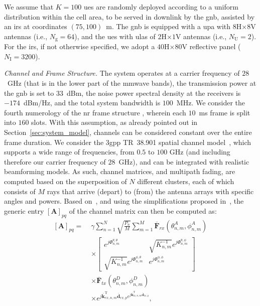 We assume that $K=100$ \glspl{ue} are randomly deployed according to a uniform distribution within the cell area, to be served in downlink by the \gls{gnb}, assisted by an \gls{irs} at coordinates  $(75, 100)$~m. 
The \gls{gnb} is equipped with a \gls{upa} with $8$H$\times8$V antennas (i.e., $N_{\mathrm g}=64$), and the \glspl{ue} with \glspl{ula} of $2$H$\times1$V antennas (i.e., $N_{\mathrm U} = 2$). 
For the \gls{irs}, if not otherwise specified, we adopt a $40$H$\times80$V reflective panel ($N_{\mathrm I}= 3200$).

\emph{Channel and Frame Structure.}
The system operates at a carrier frequency of $28$~GHz (that is in the lower part of the \gls{mmwave} bands), the transmission power at the \gls{gnb} is set to $33$~dBm, the noise power spectral density at the receivers is $-174$~dBm/Hz,  and the total system bandwidth is $100$~MHz. We consider the fourth numerology of the \gls{nr} frame structure \cite{3gpp.38.211}, wherein each $10$~ms frame is split into $160$ slots. With this assumption, as already pointed out in Section~\ref{sec:system_model}, channels can be considered constant over the entire frame duration.
We consider the \gls{3gpp} TR~38.901 spatial channel model~\cite{3gpp.38.901}, which supports a wide range of frequencies, from $0.5$ to $100$ GHz (and including therefore our carrier frequency of $28$~GHz), and can be integrated with realistic beamforming models.
As such, channel matrices, and multipath fading, are computed based on the superposition of $N$ different clusters, each of which consists of $M$ rays that arrive (depart) to (from) the antenna arrays with specific angles and powers.
Based on~\cite{3gpp.38.901}, and using the simplifications proposed in~\cite{zugno20implementation}, the generic entry $[\bm{A}]_{pq}$ of the channel matrix can then be computed as:
\begin{equation}
\label{eq:ch_model_full}
\begin{aligned}
[\bm{A}]_{pq} = \; &\gamma \sum_{n=1}^{N} \sqrt{\frac{P_{n}}{M}} \sum_{m=1}^{M} \overline{\mathbf{F}}_{r x}\left(\theta_{n, m}^{A}, \phi_{n, m}^{A}\right) \\
& \times\left[\begin{array}{cr}
e^{j \Phi_{n, m}^{\theta, \theta}} & \sqrt{K_{n, m}^{-1}} e^{j \Phi_{n, m}^{\theta, \phi}} \\
\sqrt{K_{n, m}^{-1}} e^{j \Phi_{n, m}^{\phi, \theta}} & e^{j \Phi_{n, m}^{\phi, \phi}}
\end{array}\right] \\
& \times \overline{\mathbf{F}}_{tx}\left(\theta_{n, m}^{D}, \phi_{n, m}^{D}\right) \\
& \times e^{j \overline{\mathbf{k}}_{rx, n, m}^{\mathrm T} \overline{\mathbf{d}}_{rx, p} e^{j \overline{\mathbf{k}}_{tx, n, m}^{\mathrm T} \overline{\mathbf{d}}_{tx, q}}},
\end{aligned}
\end{equation}
